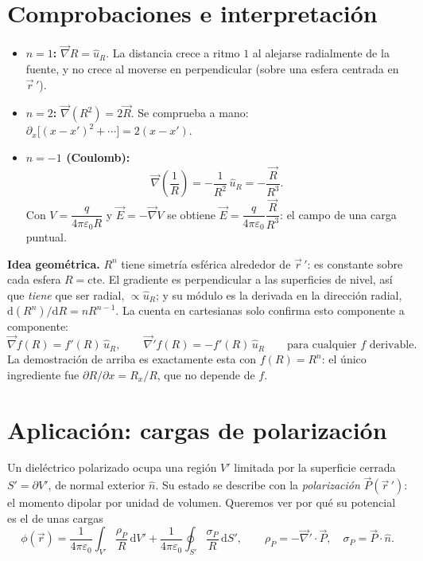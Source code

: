 \documentclass[11pt,a4paper]{article}
\numberwithin{equation}{section}
\newcommand{\vc}[1]{\vec{#1}}
\newcommand{\nab}{\vec{\nabla}}
\newcommand{\uR}{\hat u_R}
\begin{document}
\section{Comprobaciones e interpretación}
\begin{itemize}
  \item \textbf{$n=1$:} $\nab R=\uR$. La distancia crece a ritmo $1$ al
        alejarse radialmente de la fuente, y no crece al moverse en
        perpendicular (sobre una esfera centrada en $\vc{r}\,'$).
  \item \textbf{$n=2$:} $\nab(R^{2})=2\vc{R}$. Se comprueba a mano:
        $\partial_x\bigl[(x-x')^{2}+\cdots\bigr]=2(x-x')$.
  \item \textbf{$n=-1$ (Coulomb):}
        \begin{equation}\label{eq:coulomb}
          \nab\!\left(\frac1R\right)=-\frac{1}{R^{2}}\,\uR=-\frac{\vc{R}}{R^{3}} .
        \end{equation}
        Con $V=\dfrac{q}{4\pi\varepsilon_0 R}$ y $\vc{E}=-\nab V$ se obtiene
        $\vc{E}=\dfrac{q}{4\pi\varepsilon_0}\dfrac{\vc{R}}{R^{3}}$: el campo de
        una carga puntual.
\end{itemize}

\textbf{Idea geométrica.} $R^{n}$ tiene simetría esférica alrededor de
$\vc{r}\,'$: es constante sobre cada esfera $R=\text{cte}$. El gradiente es
perpendicular a las superficies de nivel, así que \emph{tiene} que ser radial,
$\propto\uR$; y su módulo es la derivada en la dirección radial,
$\mathrm d(R^{n})/\mathrm dR=nR^{n-1}$. La cuenta en cartesianas solo confirma
esto componente a componente:
\begin{equation}\label{eq:general}
  \nab f(R)=f'(R)\,\uR,\qquad \nab' f(R)=-f'(R)\,\uR
  \qquad\text{para cualquier } f \text{ derivable}.
\end{equation}
La demostración de arriba es exactamente esta con $f(R)=R^{n}$: el único
ingrediente fue $\partial R/\partial x=R_x/R$, que no depende de $f$.

\section{Aplicación: cargas de polarización}\label{sec:polarizacion}
Un dieléctrico polarizado ocupa una región $V'$ limitada por la superficie
cerrada $S'=\partial V'$, de normal exterior $\hat n$. Su estado se describe con
la \emph{polarización} $\vc{P}(\vc{r}\,')$: el momento dipolar por unidad de
volumen. Queremos ver por qué su potencial es el de unas cargas
\begin{equation}\label{eq:rhoP-sigmaP}
  \phi(\vc{r})=\frac{1}{4\pi\varepsilon_0}\int_{V'}\frac{\rho_P}{R}\,\mathrm dV'
  +\frac{1}{4\pi\varepsilon_0}\oint_{S'}\frac{\sigma_P}{R}\,\mathrm dS',
  \qquad \rho_P=-\nab'\cdot\vc{P},\quad \sigma_P=\vc{P}\cdot\hat n .
\end{equation}
\end{document}
